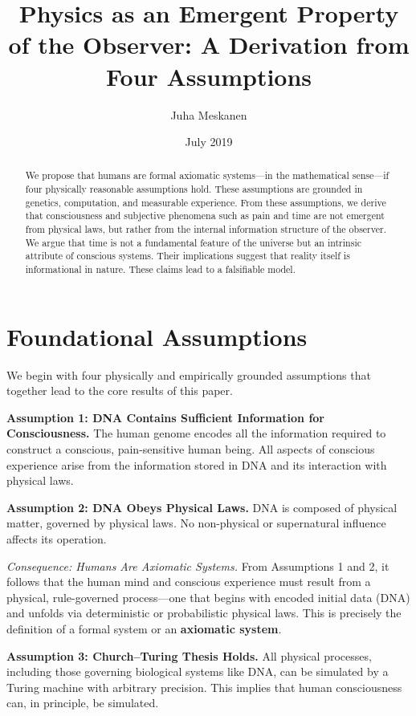 \documentclass[11pt]{article}
\title{Physics as an Emergent Property of the Observer: A Derivation from Four Assumptions}
\author{Juha Meskanen}
\date{July 2019}
\begin{document}
\maketitle

\begin{abstract}
  We propose that humans are formal axiomatic systems—in the mathematical sense—if four physically
  reasonable assumptions hold. These assumptions are grounded in genetics, computation, and measurable
  experience. From these assumptions, we derive that consciousness and subjective phenomena such as pain
  and time are not emergent from physical laws, but rather from the internal information structure of the observer. We argue that time is not a fundamental feature of the universe but an intrinsic attribute of conscious systems. Their implications suggest that reality itself is informational in nature. These claims lead to a falsifiable model.
\end{abstract}

\section{Foundational Assumptions}

We begin with four physically and empirically grounded assumptions that together lead to the core results of this paper.

\textbf{Assumption 1: DNA Contains Sufficient Information for Consciousness.}
The human genome encodes all the information required to construct a conscious, pain-sensitive human being. All aspects of conscious experience arise from the information stored in DNA and its interaction with physical laws.

\textbf{Assumption 2: DNA Obeys Physical Laws.}
DNA is composed of physical matter, governed by physical laws. No non-physical or supernatural influence affects its operation.

\vspace{0.5em}
\textit{Consequence: Humans Are Axiomatic Systems.}
From Assumptions 1 and 2, it follows that the human mind and conscious experience must result from a physical, rule-governed process—one that begins with encoded initial data (DNA) and unfolds via deterministic or probabilistic physical laws. This is precisely the definition of a formal system or an \textbf{axiomatic system}.

\vspace{0.5em}
\textbf{Assumption 3: Church–Turing Thesis Holds.}
All physical processes, including those governing biological systems like DNA, can be simulated by a Turing machine with arbitrary precision. This implies that human consciousness can, in principle, be simulated.
\end{document}
